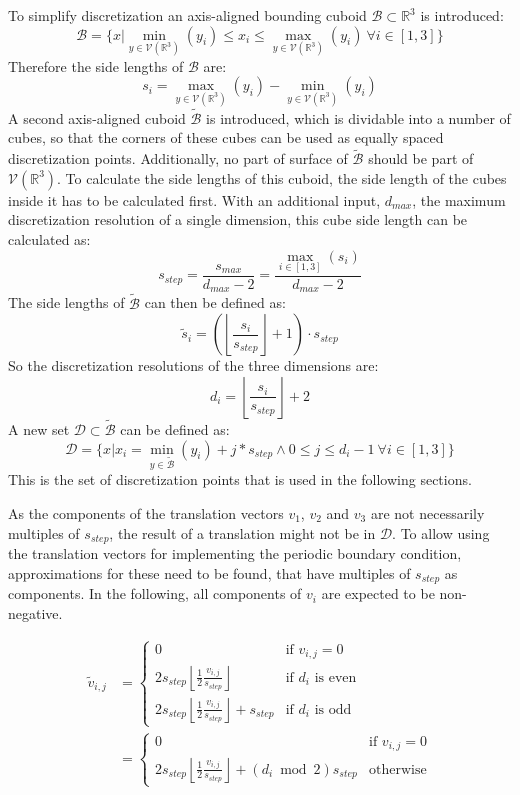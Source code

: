   To simplify discretization an axis-aligned bounding cuboid $\mathcal{B} \subset \mathbb{R}^3$ is introduced:
  \[
  \mathcal{B} = \{x | \min_{y \in \mathcal{V}(\mathbb{R}^3)}(y_i) \le x_i \le  \max_{y \in \mathcal{V}(\mathbb{R}^3)}(y_i) ~\forall i \in [1,3]\}
  \]
  Therefore the side lengths of $\mathcal{B}$ are: \[s_i = \max_{y \in \mathcal{V}(\mathbb{R}^3)}(y_i)-\min_{y \in \mathcal{V}(\mathbb{R}^3)}(y_i)\]
  A second axis-aligned cuboid $\mathcal{\tilde{B}}$ is introduced, which is dividable into a number of cubes, so that the corners of these cubes can be used as equally spaced  discretization points. Additionally, no part of surface of $\mathcal{\tilde{B}}$ should be part of $\mathcal{V}(\mathbb{R}^3)$. To calculate the side lengths of this cuboid, the side length of the cubes inside it has to be calculated first. With an additional input, $d_{max}$, the maximum discretization resolution of a single dimension, this cube side length can be calculated as:
\[
s_{step} = \frac{s_{max}}{d_{max}-2} = \frac{\max_{i \in [1,3]}(s_i)}{d_{max}-2}
\]
The side lengths of $\mathcal{\tilde{B}}$ can then be defined as:
\[
\tilde{s}_i = (\left\lfloor \frac{s_i}{s_{step}}\right\rfloor+1) \cdot s_{step}
\]
So the discretization resolutions of the three dimensions are:
\[
d_i = \left\lfloor \frac{s_i}{s_{step}}\right\rfloor+2 
\]
A new set $\mathcal{D} \subset \mathcal{\tilde{B}}$ can be defined as:
\[
\mathcal{D} = \{x | x_i = \min_{y \in \mathcal{\tilde{B}}}(y_i)+j*s_{step} \land 0 \le j \le d_i-1~\forall i \in [1,3]\}
\]
This is the set of discretization points that is used in the following sections.

As the components of the translation vectors $v_1$, $v_2$ and $v_3$ are not necessarily multiples of $s_{step}$, the result of a translation might not be in $\mathcal{D}$. To allow using the translation vectors for implementing the periodic boundary condition, approximations for these need to be found, that have multiples of $s_{step}$ as components. In the following, all components of $v_i$ are expected to be non-negative.

\begin{align*}
\tilde{v}_{i,j} &= \begin{cases}0 & \text{if } v_{i,j} = 0\\
2 s_{step}\left\lfloor \frac{1}{2} \frac{v_{i,j}}{s_{step}}\right\rfloor & \text{if } d_i \text{ is even}\\
2 s_{step}\left\lfloor \frac{1}{2} \frac{v_{i,j}}{s_{step}}\right\rfloor + s_{step}& \text{if } d_i \text{ is odd}\end{cases}
\\&= \begin{cases}0 & \text{if } v_{i,j} = 0\\
2 s_{step}\left\lfloor \frac{1}{2} \frac{v_{i,j}}{s_{step}}\right\rfloor + (d_i \bmod 2) s_{step}& \text{otherwise}\end{cases}
\end{align*}
